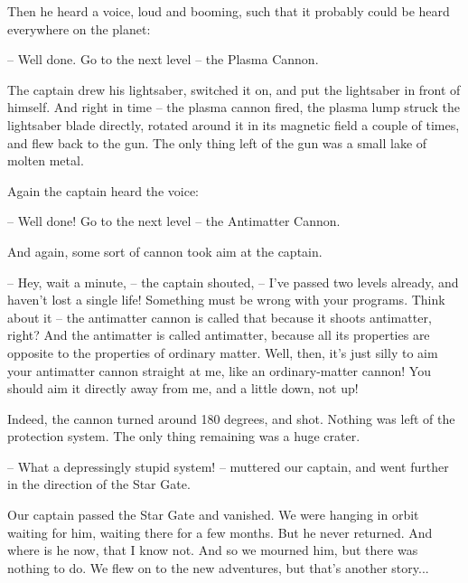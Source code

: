 \documentclass[ebook,twoside,final,openright]{memoir}
\begin{document}
\par
Then he heard a voice, loud and booming, such that it probably could be heard everywhere on the planet:\par
– Well done. Go to the next level – the Plasma Cannon.\par
The captain drew his lightsaber, switched it on, and put the lightsaber in front of himself. And right in time – the plasma cannon fired, the plasma lump struck the lightsaber blade directly, rotated around it in its magnetic field a couple of times, and flew back to the gun. The only thing left of the gun was a small lake of molten metal.\par
\par
Again the captain heard the voice:\par
– Well done! Go to the next level – the Antimatter Cannon.\par
And again, some sort of cannon took aim at the captain.\par
– Hey, wait a minute, – the captain shouted, – I’ve passed two levels already, and haven’t lost a single life! Something must be wrong with your programs. Think about it – the antimatter cannon is called that because it shoots antimatter, right? And the antimatter is called antimatter, because all its properties are opposite to the properties of ordinary matter. Well, then, it’s just silly to aim your antimatter cannon straight at me, like an ordinary-matter cannon! You should aim it directly away from me, and a little down, not up!\par
\par
Indeed, the cannon turned around 180 degrees, and shot. Nothing was left of the protection system. The only thing remaining was a huge crater.\par
– What a depressingly stupid system! – muttered our captain, and went further in the direction of the Star Gate.\par
\par
Our captain passed the Star Gate and vanished. We were hanging in orbit waiting for him, waiting there for a few months. But he never returned. And where is he now, that I know not. And so we mourned him, but there was nothing to do. We flew on to the new adventures, but that's another story...
\end{document}

